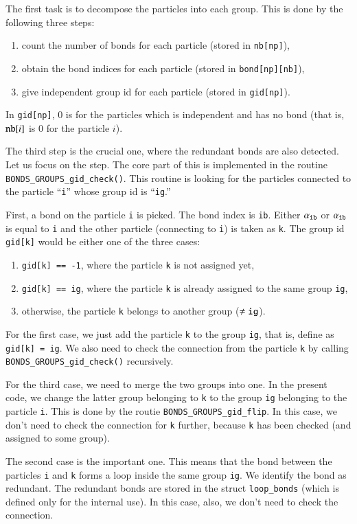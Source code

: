 The first task is to decompose the particles into each group. 
This is done by the following three steps:
\begin{enumerate}
\item count the number of bonds for each particle (stored in {\tt nb[np]}),
\item obtain the bond indices for each particle (stored in {\tt bond[np][nb]}),
\item give independent group id for each particle (stored in {\tt gid[np]}).
\end{enumerate}
In {\tt gid[np]}, 0 is for the particles which is independent 
and has no bond (that is, ${\tt nb}[i]$ is 0 for the particle $i$). 

The third step is the crucial one, where the redundant bonds are also detected. 
Let us focus on the step. The core part of this is implemented in 
the routine {\tt BONDS\_GROUPS\_gid\_check()}. 
This routine is looking for the particles connected to 
the particle ``{\tt i}'' whose group id is ``{\tt ig}.''

First, a bond on the particle {\tt i} is picked. 
The bond index is {\tt ib}. 
Either $\alpha_{\tt ib}$ or $\alpha_{\tt ib}$ is equal to {\tt i} 
and the other particle (connecting to {\tt i}) is taken as {\tt k}. 
The group id {\tt gid[k]} would be either one of the three cases:
\begin{enumerate}
\item {\tt gid[k] == -1},
  where the particle {\tt k} is not assigned yet,
\item {\tt gid[k] == ig},
  where the particle {\tt k} is already assigned to the same group {\tt ig}, 
\item otherwise,
  the particle {\tt k} belongs to another group ($\neq{\tt ig}$).
\end{enumerate}
For the first case, we just add the particle {\tt k} to the group {\tt ig}, 
that is, define as {\tt gid[k] = ig}. We also need to check 
the connection from the particle {\tt k} by calling 
{\tt BONDS\_GROUPS\_gid\_check()} recursively. 

For the third case, we need to merge the two groups into one. 
In the present code, we change the latter group belonging to {\tt k} 
to the group {\tt ig} belonging to the particle {\tt i}. 
This is done by the routie {\tt BONDS\_GROUPS\_gid\_flip}. 
In this case, we don't need to check the connection for {\tt k} further, 
because {\tt k} has been checked (and assigned to some group). 

The second case is the important one. 
This means that the bond between the particles {\tt i} and {\tt k} 
forms a loop inside the same group {\tt ig}. 
We identify the bond as redundant. 
The redundant bonds are stored in the struct {\tt loop\_bonds} 
(which is defined only for the internal use). 
In this case, also, we don't need to check the connection. 



